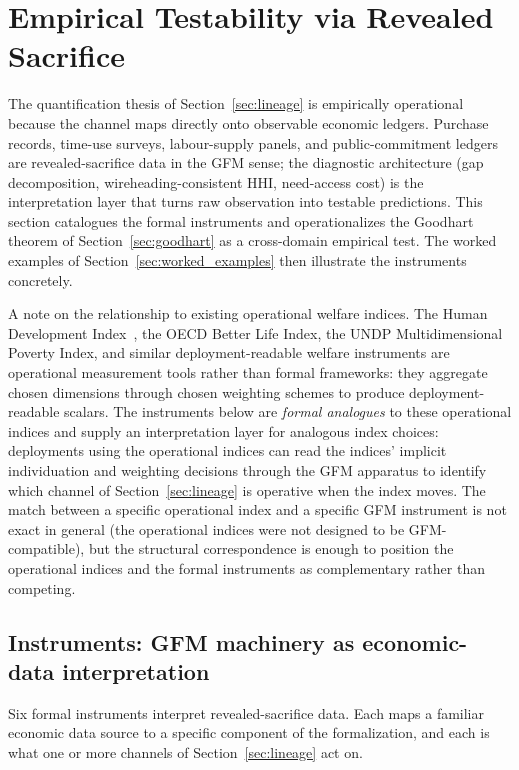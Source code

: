 \section{Empirical Testability via Revealed Sacrifice}
\label{sec:empirical}

The quantification thesis of Section~\ref{sec:lineage} is
empirically operational because the
\citep[Revealed~Sacrifice]{lasser2026paper8a} channel maps
directly onto observable economic ledgers.  Purchase records,
time-use surveys, labour-supply panels, and public-commitment
ledgers are revealed-sacrifice data in the GFM sense; the
\citep[Need~Sufficiency]{lasser2026paper8b} diagnostic
architecture (gap decomposition, wireheading-consistent HHI,
need-access cost) is the interpretation layer that turns raw
observation into testable predictions.  This section catalogues
the formal instruments and operationalizes the Goodhart theorem
of Section~\ref{sec:goodhart} as a cross-domain empirical test.
The worked examples of Section~\ref{sec:worked_examples} then
illustrate the instruments concretely.

A note on the relationship to existing operational welfare
indices.  The Human Development
Index~\citep{anand1994human}, the OECD Better Life Index, the
UNDP Multidimensional Poverty Index, and similar
deployment-readable welfare instruments are operational
measurement tools rather than formal frameworks: they aggregate
chosen dimensions through chosen weighting schemes to produce
deployment-readable scalars.  The instruments below are
\emph{formal analogues} to these operational indices and supply
an interpretation layer for analogous index choices: deployments
using the operational indices can read the indices' implicit
individuation and weighting decisions through the GFM apparatus
to identify which channel of Section~\ref{sec:lineage} is
operative when the index moves.  The match between a specific
operational index and a specific GFM instrument is not exact
in general (the operational indices were not designed to be
GFM-compatible), but the structural correspondence is enough
to position the operational indices and the formal instruments
as complementary rather than competing.

\subsection{Instruments: GFM machinery as economic-data interpretation}
\label{sec:instruments}

Six formal instruments interpret revealed-sacrifice data.  Each
maps a familiar economic data source to a specific component of
the formalization, and each is what one or more channels of
Section~\ref{sec:lineage} act on.

